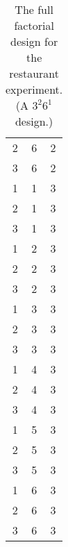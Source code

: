 \documentclass[article, crop=false]{standalone}
\begin{document}
\begin{table}[!hb]
\begin{tabular}{ccc}
2 & 6 & 2\\
3 & 6 & 2\\
1 & 1 & 3\\
2 & 1 & 3\\
3 & 1 & 3\\
1 & 2 & 3\\
2 & 2 & 3\\
3 & 2 & 3\\
1 & 3 & 3\\
2 & 3 & 3\\
3 & 3 & 3\\
1 & 4 & 3\\
2 & 4 & 3\\
3 & 4 & 3\\
1 & 5 & 3\\
2 & 5 & 3\\
3 & 5 & 3\\
1 & 6 & 3\\
2 & 6 & 3\\
3 & 6 & 3\\
\bottomrule
\end{tabular}
\caption{The full factorial design for the restaurant experiment. (A $3^2 6^1$ design.)}
\label{tab:restaurant-full-factorial}
\end{table}

\ifstandalone


\fi
\end{document}
